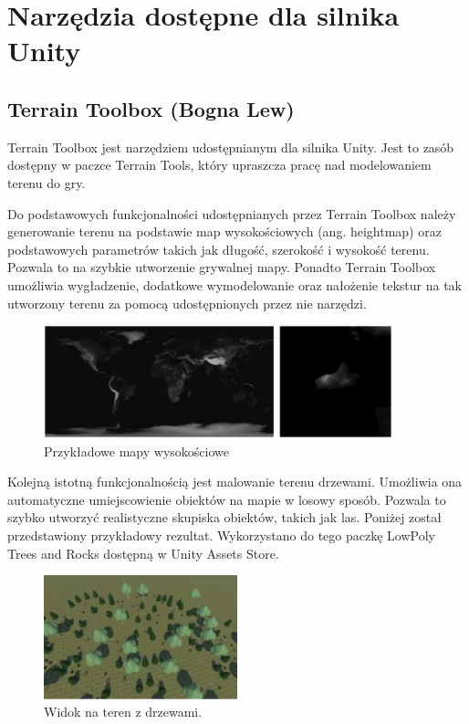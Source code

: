 \section{Narzędzia dostępne dla silnika Unity}
\subsection{Terrain Toolbox (Bogna Lew)}
Terrain Toolbox jest narzędziem udostępnianym dla silnika Unity. Jest to zasób dostępny w paczce Terrain Tools, który
upraszcza pracę nad modelowaniem terenu do gry.

Do podstawowych funkcjonalności udostępnianych przez Terrain Toolbox należy generowanie terenu na podstawie
map wysokościowych (ang. heightmap) oraz podstawowych parametrów takich jak długość, szerokość i wysokość terenu.
Pozwala to na szybkie utworzenie grywalnej mapy. Ponadto Terrain Toolbox umożliwia wygładzenie, dodatkowe
wymodelowanie oraz nałożenie tekstur na tak utworzony terenu za pomocą udostępnionych przez nie narzędzi.

\begin{figure}[h!]
    \centering
    \includegraphics[width=0.9\textwidth]{images/modelowanie_terenu/przykladowe_heightmapy.jpg}
    \caption{Przykładowe mapy wysokościowe}
\end{figure}

Kolejną istotną funkcjonalnością jest malowanie terenu drzewami. Umożliwia ona automatyczne umiejscowienie obiektów na
mapie w losowy sposób. Pozwala to szybko utworzyć realistyczne skupiska obiektów, takich jak las. Poniżej
został przedstawiony przykładowy rezultat. Wykorzystano do tego paczkę LowPoly Trees and Rocks dostępną w Unity
Assets Store.

\begin{figure}[h!]
    \centering
    \includegraphics[width=0.5\textwidth]{images/modelowanie_terenu/drzewa.jpg}
    \caption{Widok na teren z drzewami.}
\end{figure}
